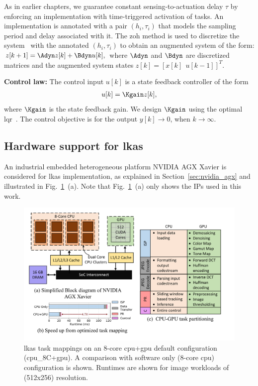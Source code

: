 As in earlier chapters, we guarantee constant sensing-to-actuation delay $\tau$ by enforcing an implementation with time-triggered activation of tasks.
An implementation is annotated with a pair $(h_i,\tau_i)$ that models the sampling period and delay associated with it.
The \gls{zoh} method is used to discretize the system~\cite{franklin1998digital} with the annotated $(h_i,\tau_i)$ to obtain an augmented system of the form:
\begin{math}
z[k+1]= \Adyn z[k] + \Bdyn u[k],
\end{math}
where $\Adyn$ and $\Bdyn$ are discretized matrices and the augmented system states $z[k]=\left[x[k]\ \ u[k-1]\right]^T$.

\noindent\textbf{Control law:} The control input $u[k]$ is a state feedback controller of the form 
 \begin{align}
		u[k] = \Kgain z[k], 
		\nonumber
 \end{align}
 where $\Kgain$ is the state feedback gain.  
 We design $\Kgain$ using the optimal \gls{lqr}~\cite{franklin1998digital}.
 The control objective is for the output $y[k]\rightarrow 0$, when $k\rightarrow\infty$.

\subsection{Hardware support for \gls{lkas}}\label{lkas_hw}
An industrial embedded heterogeneous platform NVIDIA AGX Xavier \cite{nvidiaAGX} is considered for \gls{lkas} implementation, as explained in Section~\ref{sec:nvidia_agx} and illustrated in Fig.\ \ref{fig:platform}~(a). 
Note that Fig.\ \ref{fig:platform}~(a) only shows the IPs used in this work. 

\begin{figure}[ht]
    \centering
    \includegraphics[width= \textwidth]{figs/lkas_hw_overview.pdf}
    \caption{{\gls{lkas} task mappings on an 8-core \gls{cpu}+\gls{gpu} default configuration (\gls{cpu}\_8C+\gls{gpu}). A comparison with software only (8-core \gls{cpu}) configuration is shown. Runtimes are shown for image workloads of (512x256) resolution.}}
    \label{fig:platform}
\end{figure}

